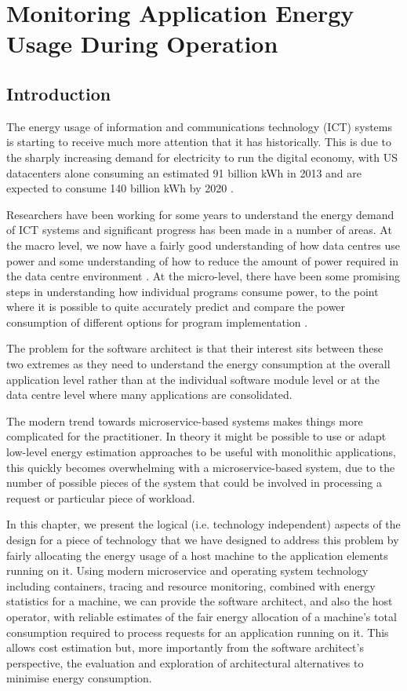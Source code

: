 \chapter{Monitoring Application Energy Usage During Operation}
\label{chapter:monitoring}

\section{Introduction}

The energy usage of information and communications technology (ICT) systems is starting to receive much more attention that it has historically.  This is due to the sharply increasing demand for electricity to run the digital economy, with US datacenters alone consuming an estimated 91 billion kWh in 2013 and are expected to consume 140 billion kWh by 2020 \cite{delforge2014-datacentreenergy}.

Researchers have been working for some years to understand the energy demand of ICT systems and significant progress has been made in a number of areas.  At the macro level, we now have a fairly good understanding of how data centres use power and some understanding of how to reduce the amount of power required in the data centre environment \cite{dc4cities2014_dcmetrics}.  At the micro-level, there have been some promising steps in understanding how individual programs consume power, to the point where it is possible to quite accurately predict and compare the power consumption of different options for program implementation \cite{islam2016-energysoftwarefeatures}.

The problem for the software architect is that their interest sits between these two extremes as they need to understand the energy consumption at the overall application level rather than at the individual software module level or at the data centre level where many applications are consolidated.

The modern trend towards microservice-based systems \cite{wikipedia_microservices} makes things more complicated for the practitioner.  In theory it might be possible to use or adapt low-level energy estimation approaches to be useful with monolithic applications, this quickly becomes overwhelming with a microservice-based system, due to the number of possible pieces of the system that could be involved in processing a request or particular piece of workload.

In this chapter, we present the logical (i.e. technology independent) aspects of the design for a piece of technology that we have designed to address this problem by fairly allocating the energy usage of a host machine to the application elements running on it.  Using modern microservice and operating system technology including containers, tracing and resource monitoring, combined with energy statistics for a machine, we can provide the software architect, and also the host operator, with reliable estimates of the fair energy allocation of a machine's total consumption required to process requests for an application running on it.  This allows cost estimation but, more importantly from the software architect's perspective, the evaluation and exploration of architectural alternatives to minimise energy consumption.

